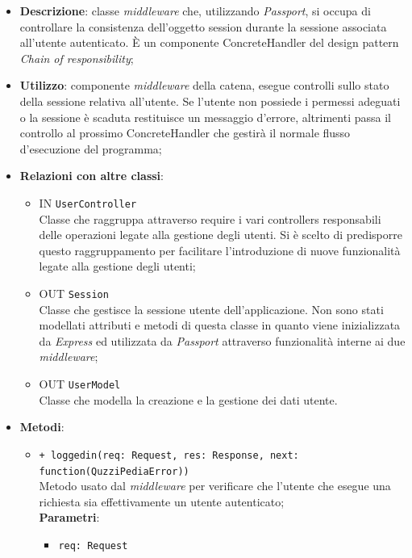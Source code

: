\begin{itemize}
	\item 
	\textbf{Descrizione}:
	classe \textit{middleware} che, utilizzando \textit{Passport}, si occupa di controllare la consistenza dell'oggetto session durante la sessione associata all'utente autenticato. È un componente ConcreteHandler del design pattern \textit{Chain of responsibility};
	\item
	\textbf{Utilizzo}:
	componente \textit{middleware} della catena, esegue controlli sullo stato della sessione relativa all'utente. Se l'utente non possiede i permessi adeguati o la sessione è scaduta restituisce un messaggio d'errore, altrimenti passa il controllo al prossimo ConcreteHandler che gestirà il normale flusso d'esecuzione del programma;
	\item
	\textbf{Relazioni con altre classi}:
	\begin{itemize}
		\item
		IN \texttt{UserController} \\
		Classe che raggruppa attraverso require i vari controllers responsabili delle operazioni legate alla gestione degli utenti. Si è scelto di predisporre questo raggruppamento per facilitare l'introduzione di nuove funzionalità legate alla gestione degli utenti;
		\item
		OUT \texttt{Session} \\
		Classe che gestisce la sessione utente dell'applicazione. Non sono stati modellati attributi e metodi di questa classe in quanto viene inizializzata da \textit{Express} ed utilizzata da \textit{Passport} attraverso funzionalità interne ai due \textit{middleware};
		\item
		OUT \texttt{UserModel} \\
		Classe che modella la creazione e la gestione dei dati utente.
	\end{itemize}
	\item
	\textbf{Metodi}:
	\begin{itemize}
		\item
		\texttt{+ loggedin(req: Request, res: Response, next: function(QuzziPediaError))} \\
		Metodo usato dal \textit{middleware} per verificare che l'utente che esegue una richiesta sia effettivamente un utente autenticato; \\
		\textbf{Parametri}:
		 \begin{itemize}
		  \item
			\texttt{req: Request} \\

\end{itemize}
\end{itemize}
\end{itemize}
